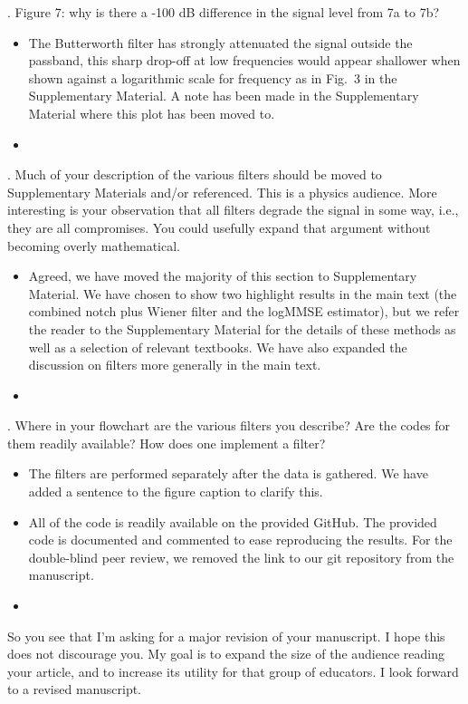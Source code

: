 \documentclass{article}
\begin{document}
. Figure 7: why is there a -100 dB difference in the signal level from 7a to 7b?  
\begin{itemize}
\item The Butterworth filter has strongly attenuated the signal outside the passband, this sharp drop-off at low frequencies would appear shallower when shown against a logarithmic scale for frequency as in Fig.~3 in the Supplementary Material. A note has been made in the Supplementary Material where this plot has been moved to.
\item[]
\end{itemize}


. Much of your description of the various filters should be moved to Supplementary Materials and/or referenced.  This is a physics audience.  More interesting is your observation that all filters degrade the signal in some way, i.e., they are all compromises.  You could usefully expand that argument without becoming overly mathematical.
\begin{itemize}
\item Agreed, we have moved the majority of this section to Supplementary Material. We have chosen to show two highlight results in the main text (the combined notch plus Wiener filter and the logMMSE estimator), but we refer the reader to the Supplementary Material for the details of these methods as well as a selection of relevant textbooks. We have also expanded the discussion on filters more generally in the main text. 
\item[]
\end{itemize}


. Where in your flowchart are the various filters you describe?  Are the codes for them readily available?  How does one implement a filter?  
\begin{itemize}
\item The filters are performed separately after the data is gathered. We have added a sentence to the figure caption to clarify this. 
\item All of the code is readily available on the provided GitHub. The provided code is documented and commented to ease reproducing the results. For the double-blind peer review, we removed the link to our git repository from the manuscript. 
\item[]
\end{itemize}


\noindent So you see that I'm asking for a major revision of your manuscript.  I hope this does not discourage you.  My goal is to expand the size of the audience reading your article, and to increase its utility for that group of educators.  I look forward to a revised manuscript.
\end{document}
